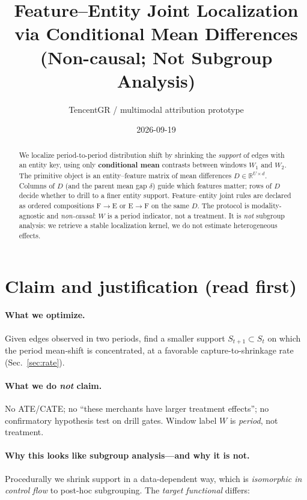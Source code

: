 \documentclass[11pt]{article}
\title{\textbf{Feature--Entity Joint Localization}\\
\large via Conditional Mean Differences\\
\large (Non-causal; Not Subgroup Analysis)}
\author{TencentGR / multimodal attribution prototype}
\date{2026-09-19}
\newcommand{\R}{\mathbb{R}}
\begin{document}
\maketitle

\begin{abstract}
We localize period-to-period distribution shift by shrinking the
\emph{support} of edges with an entity key, using only
\textbf{conditional mean} contrasts between windows \(W_1\) and \(W_2\).
The primitive object is an entity--feature matrix of mean differences
\(D\in\R^{U\times d}\). Columns of \(D\) (and the parent mean gap
\(\delta\)) guide which features matter; rows of \(D\) decide whether
to drill to a finer entity support. Feature--entity joint rules are
declared as ordered compositions \(\mathrm{F}\!\to\!\mathrm{E}\) or
\(\mathrm{E}\!\to\!\mathrm{F}\) on the same \(D\). The protocol is
modality-agnostic and \emph{non-causal}: \(W\) is a period indicator,
not a treatment. It is \emph{not} subgroup analysis: we retrieve a
stable localization kernel, we do not estimate heterogeneous effects.
\end{abstract}

\tableofcontents
\vspace{1em}

\section{Claim and justification (read first)}
\label{sec:justify}

\paragraph{What we optimize.}
Given edges observed in two periods, find a smaller support
\(S_{t+1}\subset S_t\) on which the period mean-shift is concentrated,
at a favorable capture-to-shrinkage rate (Sec.~\ref{sec:rate}).

\paragraph{What we do \emph{not} claim.}
No ATE/CATE; no ``these merchants have larger treatment effects'';
no confirmatory hypothesis test on drill gates. Window label \(W\) is
\emph{period}, not treatment.

\paragraph{Why this looks like subgroup analysis---and why it is not.}
Procedurally we shrink support in a data-dependent way, which is
\emph{isomorphic in control flow} to post-hoc subgrouping. The
\emph{target functional} differs:
\end{document}
